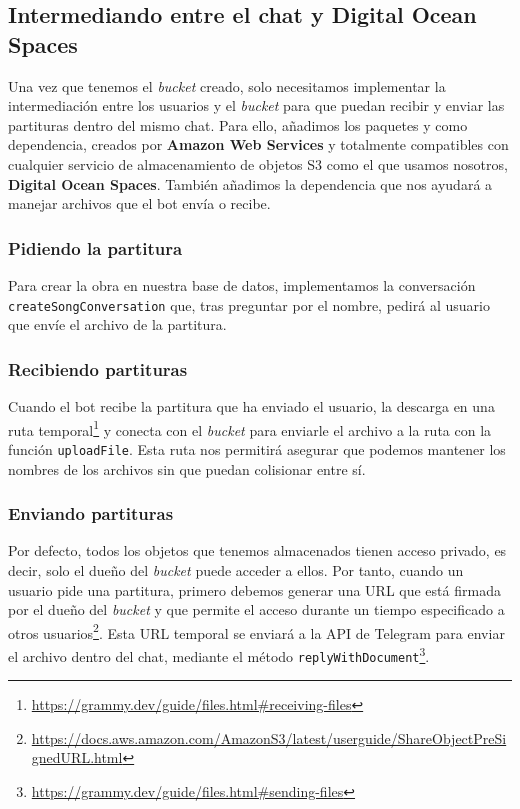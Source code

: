 \subsection{Intermediando entre el chat y Digital Ocean Spaces}

Una vez que tenemos el \textit{bucket} creado, solo necesitamos implementar la intermediación entre los usuarios y el \textit{bucket} para que puedan recibir y enviar las partituras dentro del mismo chat. Para ello, añadimos los paquetes  y  como dependencia, creados por \textbf{Amazon Web Services} y totalmente compatibles con cualquier servicio de almacenamiento de objetos S3 como el que usamos nosotros, \textbf{Digital Ocean Spaces}. También añadimos la dependencia  que nos ayudará a manejar archivos que el bot envía o recibe.

\subsubsection{Pidiendo la partitura}

Para crear la obra en nuestra base de datos, implementamos la conversación \texttt{createSongConversation} que, tras preguntar por el nombre, pedirá al usuario que envíe el archivo de la partitura.

\subsubsection{Recibiendo partituras}

Cuando el bot recibe la partitura que ha enviado el usuario, la descarga en una ruta temporal\footnote{\url{https://grammy.dev/guide/files.html\#receiving-files}} y conecta con el \textit{bucket} para enviarle el archivo a la ruta  con la función \texttt{uploadFile}. Esta ruta nos permitirá asegurar que podemos mantener los nombres de los archivos sin que puedan colisionar entre sí.

\subsubsection{Enviando partituras}

Por defecto, todos los objetos que tenemos almacenados tienen acceso privado, es decir, solo el dueño del \textit{bucket} puede acceder a ellos. Por tanto, cuando un usuario pide una partitura, primero debemos generar una URL que está firmada por el dueño del \textit{bucket} y que permite el acceso durante un tiempo especificado a otros usuarios\footnote{\url{https://docs.aws.amazon.com/AmazonS3/latest/userguide/ShareObjectPreSignedURL.html}}. Esta URL temporal se enviará a la API de Telegram para enviar el archivo dentro del chat, mediante el método \texttt{replyWithDocument}\footnote{\url{https://grammy.dev/guide/files.html\#sending-files}}.

